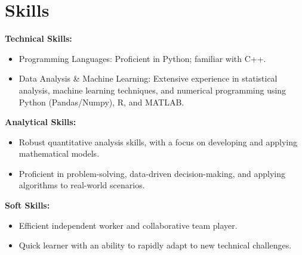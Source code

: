 \section{Skills}
\textbf{Technical Skills:}
\begin{itemize}[leftmargin=*]
    \item Programming Languages: Proficient in Python; familiar with C++.
    \item Data Analysis \& Machine Learning: Extensive experience in statistical analysis, machine learning techniques, and numerical programming using Python (Pandas/Numpy), R, and MATLAB.
\end{itemize}
\textbf{Analytical Skills:}
\begin{itemize}[leftmargin=*]
    \item Robust quantitative analysis skills, with a focus on developing and applying mathematical models.
    \item Proficient in problem-solving, data-driven decision-making, and applying algorithms to real-world scenarios.
\end{itemize}
\textbf{Soft Skills:}
\begin{itemize}[leftmargin=*]
    \item Efficient independent worker and collaborative team player.
    \item Quick learner with an ability to rapidly adapt to new technical challenges.
\end{itemize}
